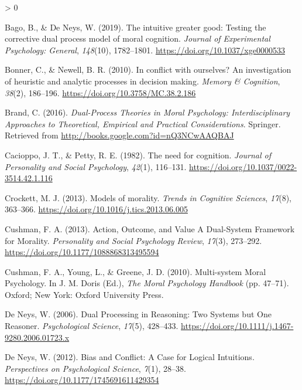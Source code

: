 \documentclass[
  american,
  man,floatsintext]{apa7}
\newlength{\cslhangindent}
\newenvironment{CSLReferences}[2] %
 {%
  \setlength{\parindent}{0pt}
  \ifodd #1 \everypar{\setlength{\hangindent}{\cslhangindent}}\ignorespaces\fi
  \ifnum #2 > 0
  \setlength{\parskip}{#2\baselineskip}
  \fi
 }%
 {}
\begin{document}
\hypertarget{refs}{}
\begin{CSLReferences}{1}{0}
\leavevmode\hypertarget{ref-bago_intuitive_2019}{}%
Bago, B., \& De Neys, W. (2019). The intuitive greater good: Testing the corrective dual process model of moral cognition. \emph{Journal of Experimental Psychology: General}, \emph{148}(10), 1782--1801. \url{https://doi.org/10.1037/xge0000533}

\leavevmode\hypertarget{ref-bonner_conflict_2010}{}%
Bonner, C., \& Newell, B. R. (2010). In conflict with ourselves? An investigation of heuristic and analytic processes in decision making. \emph{Memory \& Cognition}, \emph{38}(2), 186--196. \url{https://doi.org/10.3758/MC.38.2.186}

\leavevmode\hypertarget{ref-brand_dualprocess_2016}{}%
Brand, C. (2016). \emph{Dual-{Process Theories} in {Moral Psychology}: Interdisciplinary {Approaches} to {Theoretical}, {Empirical} and {Practical Considerations}}. {Springer}. Retrieved from \url{http://books.google.com?id=nQ3NCwAAQBAJ}

\leavevmode\hypertarget{ref-cacioppo_need_1982}{}%
Cacioppo, J. T., \& Petty, R. E. (1982). The need for cognition. \emph{Journal of Personality and Social Psychology}, \emph{42}(1), 116--131. \url{https://doi.org/10.1037/0022-3514.42.1.116}

\leavevmode\hypertarget{ref-crockett_models_2013}{}%
Crockett, M. J. (2013). Models of morality. \emph{Trends in Cognitive Sciences}, \emph{17}(8), 363--366. \url{https://doi.org/10.1016/j.tics.2013.06.005}

\leavevmode\hypertarget{ref-cushman_action_2013}{}%
Cushman, F. A. (2013). Action, {Outcome}, and {Value A Dual}-{System Framework} for {Morality}. \emph{Personality and Social Psychology Review}, \emph{17}(3), 273--292. \url{https://doi.org/10.1177/1088868313495594}

\leavevmode\hypertarget{ref-cushman_multisystem_2010}{}%
Cushman, F. A., Young, L., \& Greene, J. D. (2010). Multi-system {Moral Psychology}. In J. M. Doris (Ed.), \emph{The {Moral Psychology Handbook}} (pp. 47--71). {Oxford; New York}: {Oxford University Press}.

\leavevmode\hypertarget{ref-deneys_dual_2006}{}%
De Neys, W. (2006). Dual {Processing} in {Reasoning}: Two {Systems} but {One Reasoner}. \emph{Psychological Science}, \emph{17}(5), 428--433. \url{https://doi.org/10.1111/j.1467-9280.2006.01723.x}

\leavevmode\hypertarget{ref-deneys_bias_2012}{}%
De Neys, W. (2012). Bias and {Conflict}: A {Case} for {Logical Intuitions}. \emph{Perspectives on Psychological Science}, \emph{7}(1), 28--38. \url{https://doi.org/10.1177/1745691611429354}


\end{CSLReferences}
\end{document}
